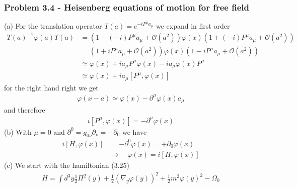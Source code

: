 \documentclass[10pt,a4paper]{book}
\theoremstyle{definition}
\begin{document}
\subsubsection{Problem 3.4 - Heisenberg equations of motion for free field}
(a) For the translation operator $T(a)=e^{-iP^\mu a_\mu}$ we expand in first order
\begin{align}
T(a)^{-1}\varphi(a)T(a)
&=\left(1-(-i)P^\mu a_\mu+\mathcal{O}(a^2)\right)\varphi(x)\left(1+(-i)P^\mu a_\mu+\mathcal{O}(a^2)\right)\\
&=\left(1+iP^\mu a_\mu+\mathcal{O}(a^2)\right)\varphi(x)\left(1-iP^\mu a_\mu+\mathcal{O}(a^2)\right)\\
&\simeq\varphi(x)+ia_\mu P^\mu\varphi(x)-ia_\mu\varphi(x)P^\mu\\
&\simeq\varphi(x)+ia_\mu [P^\mu,\varphi(x)]
\end{align}
for the right hand right we get
\begin{align}
\varphi(x-a)\simeq\varphi(x)-\partial^\mu \varphi(x)a_\mu
\end{align}
and therefore
\begin{align}
i[P^\mu,\varphi(x)]=-\partial^\mu\varphi(x)
\end{align}
(b) With $\mu=0$ and $\partial^0=g_{0\nu}\partial_\nu=-\partial_0$ we have
\begin{align}
i[H,\varphi(x)]&=-\partial^0\varphi(x)=+\partial_0\varphi(x)\\
&\rightarrow\quad\dot{\varphi}(x)=i[H,\varphi(x)]
\end{align}
(c) We start with the hamiltonian (3.25)
\begin{align}
H=\int d^3y\frac{1}{2}\Pi^2(y)+\frac{1}{2}(\nabla_y\varphi(y))^2+\frac{1}{2}m^2\varphi(y)^2-\Omega_0
\end{align}
\end{document}
